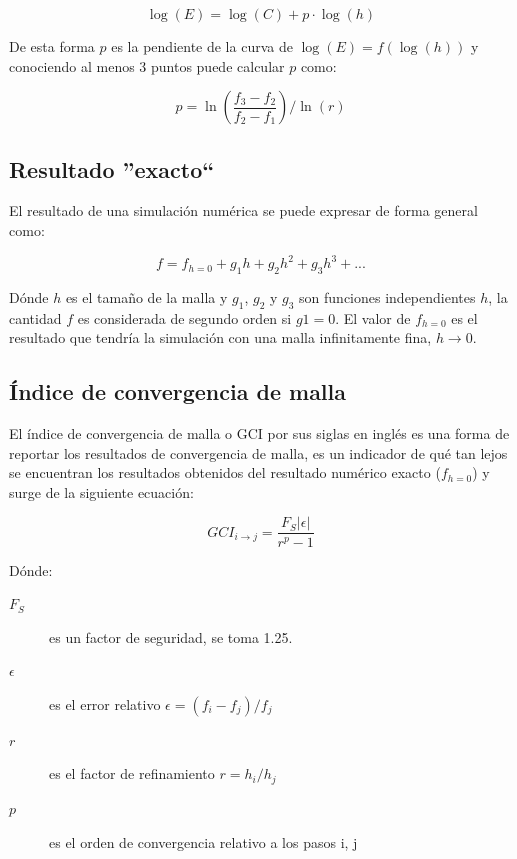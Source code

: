 \documentclass[11pt]{article}
\begin{document}
\begin{equation}
    \log(E) = \log(C) + p \cdot \log(h)
\end{equation}

De esta forma $p$ es la pendiente de la curva de $\log(E)=f(\log(h))$ y
conociendo al menos 3 puntos puede calcular $p$ como:

\begin{equation}
p = \ln \left( \frac{ f_3 - f_2 } { f_2 - f_1 } \right) / \ln(r)
\label{eq:ord-conv}
\end{equation}

\subsection{Resultado ''exacto``}
%
El resultado de una simulación numérica se puede expresar de forma general
como:

\begin{equation} \label{eq:expansion}
    f = f_{h=0} + g_1 h + g_2 h^2 + g_3 h^3 + ...
\end{equation}

Dónde $h$ es el tamaño de la malla y $g_1$, $g_2$ y $g_3$ son funciones
independientes $h$, la cantidad $f$ es considerada de segundo orden si $g1 =
0$.
%
El valor de $f_{h=0}$ es el resultado que tendría la simulación con una malla
infinitamente fina, $h \rightarrow 0$.

\subsection{Índice de convergencia de malla}
%
El índice de convergencia de malla o GCI por sus siglas en inglés es una forma
de reportar los resultados de convergencia de malla, es un indicador de qué tan
lejos se encuentran los resultados obtenidos del resultado numérico exacto
($f_{h=0}$) y surge de la siguiente ecuación:

\begin{equation} \label{eq:gci}
GCI_{i \rightarrow j} = \frac{F_S |\epsilon|}{r^p - 1}
\end{equation}

Dónde:
\begin{description}
    \item[$F_S$] es un factor de seguridad, se toma 1.25.
    \item[$\epsilon$] es el error relativo $\epsilon = (f_i - f_j) / f_j$
    \item[$r$] es el factor de refinamiento $r = h_i/h_j$
    \item[$p$] es el orden de convergencia relativo a los pasos i, j
\end{description}
\end{document}
